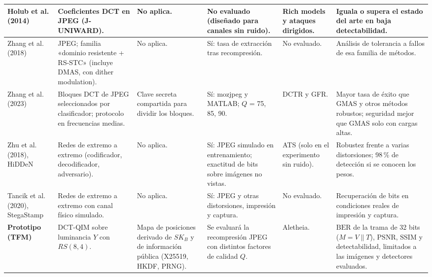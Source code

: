 \documentclass[IB]{TFUOC}%
\begin{document}
\begin{table}[H]
\begin{tabular}{|p{2.1cm}|p{2.2cm}|p{2.1cm}|p{2.5cm}|p{2.3cm}|p{3.2cm}|}
Holub et al. (2014) \cite{17} &
Coeficientes DCT en JPEG (J-UNIWARD). &
No aplica. &
No evaluado (diseñado para canales sin ruido). &
Rich models y ataques dirigidos. &
Iguala o supera el estado del arte en baja detectabilidad. \\
\hline

Zhang et al. (2018) \cite{20} &
JPEG; familia «dominio resistente + RS-STC» (incluye DMAS, con dither modulation). &
No aplica. &
Sí: tasa de extracción tras recompresión. &
No evaluado. &
Análisis de tolerancia a fallos de esa familia de métodos. \\
\hline

Zhang et al. (2023) \cite{18} &
Bloques DCT de JPEG seleccionados por clasificador; protocolo en frecuencias medias. &
Clave secreta compartida para dividir los bloques. &
Sí: mozjpeg y MATLAB; $Q$ = 75, 85, 90. &
DCTR y GFR. &
Mayor tasa de éxito que GMAS y otros métodos robustos; seguridad mejor que GMAS solo con cargas altas. \\
\hline

Zhu et al. (2018), HiDDeN \cite{zhu2018hidden} &
Redes de extremo a extremo (codificador, decodificador, adversario). &
No aplica. &
Sí: JPEG simulado en entrenamiento; exactitud de bits sobre imágenes no vistas. &
ATS \cite{lerch2016ats} (solo en el experimento sin ruido). &
Robustez frente a varias distorsiones; 98\,\% de detección si se conocen los pesos. \\
\hline

Tancik et al. (2020), StegaStamp \cite{tancik2020stegastamp} &
Redes de extremo a extremo con canal físico simulado. &
No aplica. &
Sí: JPEG y otras distorsiones, impresión y captura. &
No evaluado. &
Recuperación de bits en condiciones reales de impresión y captura. \\
\hline

\textbf{Prototipo (TFM)} &
DCT-QIM sobre luminancia $Y$ con $RS(8,4)$. &
Mapa de posiciones derivado de $SK_B$ y de información pública (X25519, HKDF, PRNG). &
Se evaluará la recompresión JPEG con distintos factores de calidad $Q$. &
Aletheia. &
$\mathrm{BER}$ de la trama de 32 bits ($M=V\parallel T$), $\mathrm{PSNR}$, $\mathrm{SSIM}$ y detectabilidad, limitados a las imágenes y detectores evaluados. \\
\hline
\end{tabular}
\end{table}

\end{document}
